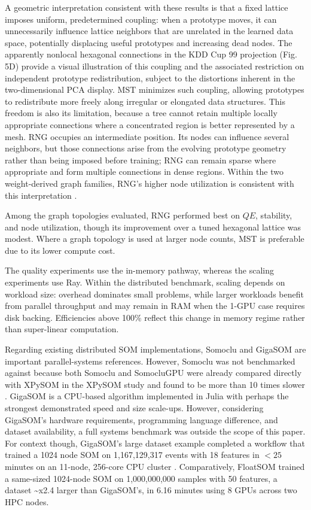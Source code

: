 \documentclass[10pt]{article} %
\begin{document}
A geometric interpretation consistent with these results is that a fixed lattice imposes uniform, predetermined coupling: when a prototype moves, it can unnecessarily influence lattice neighbors that are unrelated in the learned data space, potentially displacing useful prototypes and increasing dead nodes. The apparently nonlocal hexagonal connections in the KDD Cup 99 projection (Fig. 5D) provide a visual illustration of this coupling and the associated restriction on independent prototype redistribution, subject to the distortions inherent in the two-dimensional PCA display. MST minimizes such coupling, allowing prototypes to redistribute more freely along irregular or elongated data structures. This freedom is also its limitation, because a tree cannot retain multiple locally appropriate connections where a concentrated region is better represented by a mesh. RNG occupies an intermediate position. Its nodes can influence several neighbors, but those connections arise from the evolving prototype geometry rather than being imposed before training; RNG can remain sparse where appropriate and form multiple connections in dense regions. Within the two weight-derived graph families, RNG's higher node utilization is consistent with this interpretation \citep{kohonenEssentialsSelforganizingMap2013,kangasVariantsSelforganizingMaps1990,toussaintRelativeNeighbourhoodGraph1980}.

Among the graph topologies evaluated, RNG performed best on $QE$, stability, and node utilization, though its improvement over a tuned hexagonal lattice was modest. Where a graph topology is used at larger node counts, MST is preferable due to its lower compute cost.

The quality experiments use the in-memory pathway, whereas the scaling experiments use Ray. Within the distributed benchmark, scaling depends on workload size: overhead dominates small problems, while larger workloads benefit from parallel throughput and may remain in RAM when the 1-GPU case requires disk backing. Efficiencies above 100\% reflect this change in memory regime rather than super-linear computation.

Regarding existing distributed SOM implementations, Somoclu and GigaSOM are important parallel-systems references. However, Somoclu was not benchmarked against because both Somoclu and SomocluGPU were already compared directly with XPySOM in the XPySOM study and found to be more than 10 times slower \citep{manciniXPySomHighPerformanceSelfOrganizing2020}. GigaSOM is a CPU-based algorithm implemented in Julia with perhaps the strongest demonstrated speed and size scale-ups. However, considering GigaSOM's hardware requirements, programming language difference, and dataset availability, a full systems benchmark was outside the scope of this paper. For context though, GigaSOM's large dataset example completed a workflow that trained a 1024 node SOM on 1,167,129,317 events with 18 features in $<25$ minutes on an 11-node, 256-core CPU cluster \citep{kratochvilGigaSOMjlHighperformanceClustering2020}. Comparatively, FloatSOM trained a same-sized 1024-node SOM on 1,000,000,000 samples with 50 features, a dataset \textasciitilde{}x2.4 larger than GigaSOM's, in 6.16 minutes using 8 GPUs across two HPC nodes.
\end{document}
